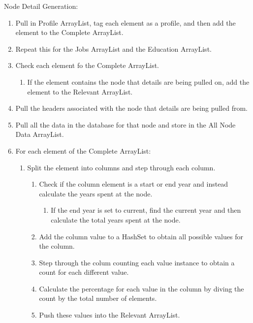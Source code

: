 \begin{description}
    \item[Node Detail Generation:]
\end{description}
\begin{enumerate}
  \item Pull in Profile ArrayList, tag each element as a profile, and then add
  the element to the Complete ArrayList.
  \item Repeat this for the Jobs ArrayList and the Education ArrayList.
  \item Check each element fo the Complete ArrayList.
  \begin{enumerate}
    \item If the element contains the node that details are being pulled on, add
    the element to the Relevant ArrayList.
  \end{enumerate}
  \item Pull the headers associated with the node that details are being pulled
  from.
  \item Pull all the data in the database for that node and store in the All
  Node Data ArrayList.
  \item For each element of the Complete ArrayList:
  \begin{enumerate}
    \item Split the element into columns and step through each column.
    \begin{enumerate}
    	\item Check if the column element is a start or end year and instead
    	calculate the years spent at the node.
    	\begin{enumerate}
    	  \item If the end year is set to current, find the current year and then
    	  calculate the total years spent at the node.
    	\end{enumerate}
    	\item Add the column value to a HashSet to obtain all possible values for
    	the column.
    	\item Step through the colum counting each value instance to obtain a count
    	for each different value.
    	\item Calculate the percentage for each value in the column by diving the
    	count by the total number of elements.
    	\item Push these values into the Relevant ArrayList.
    \end{enumerate} 
  \end{enumerate}

\end{enumerate}
